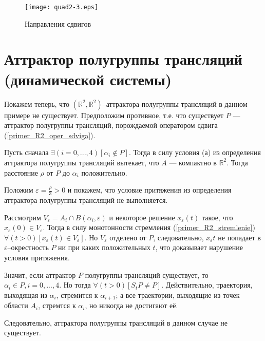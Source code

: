 \begin{wrapfigure}[14]{r}{7.5cm}
	\texttt{[image: quad2-3.eps]}
	\caption{Направления сдвигов}
	\label{fig:somelabel3}
\end{wrapfigure}

\section{Аттрактор полугруппы трансляций (динамической системы)}

Покажем теперь, что $(\mathbb{R}^2,\mathbb{R}^2)$--аттрактора полугруппы трансляций в данном примере не существует.
Предположим противное, т.е. что существует $P$ --- аттрактор полугруппы трансляций,
порождаемой оператором сдвига (\ref{primer_R2_oper_sdviga}).

Пусть сначала $\exists(i=0,...,4)[\alpha_i \notin P]$.
Тогда в силу условия (а) из определения аттрактора полугруппы трансляций вытекает,
что $A$ --- компактно в $\mathbb{R}^2$.
Тогда расстояние $\rho$ от $P$ до $\alpha_i$ положительно.

Положим $\varepsilon = \frac{\rho}{3} > 0$ и покажем,
что условие притяжения из определения аттрактора полугруппы трансляций не выполняется.

Рассмотрим $V_\varepsilon = A_i \cap B(\alpha_i, \varepsilon)$ и некоторое решение $x_\varepsilon(t)$
такое, что $x_\varepsilon(0) \in V_\varepsilon$.
Тогда в силу монотонности стремления (\ref{primer_R2_stremlenie})
$\forall(t>0)[x_\varepsilon(t) \in V_\varepsilon]$.
Но $V_\varepsilon$ отделено от $P$, следовательно, $x_\varepsilon{t}$ не попадает в $\varepsilon$--окрестность $P$
ни при каких положительных $t$, что доказывает нарушение условия притяжения.

Значит, если аттрактор $P$ полугруппы трансляций существует, то $\alpha_i \in P, i=0,...,4$.
Но тогда $\forall(t>0)[S_t P \ne P]$.
Действительно, траектория, выходящая из $\alpha_i$, стремится к $\alpha_{i+1}$;
а все траектории, выходящие из точек области $A_i$, стремтся к $\alpha_i$,
но никогда не достигают её.

Следовательно, аттрактора полугруппы трансляций в данном случае не существует.




